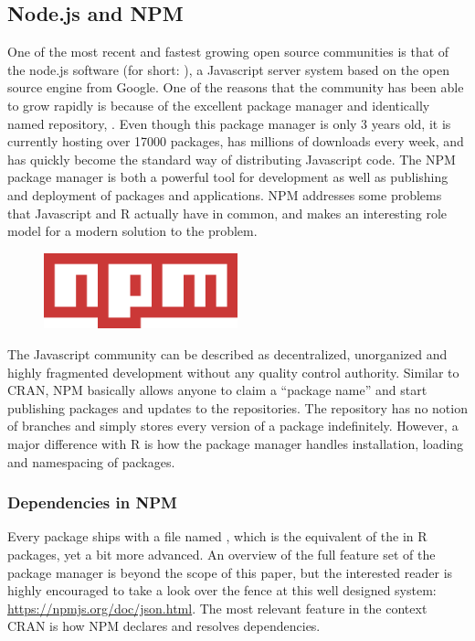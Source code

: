 \subsection{Node.js and NPM}

One of the most recent and fastest growing open source communities is that of
the node.js software (for short: ), a Javascript server
system based on the open source engine  from Google. One of the reasons
that the community has been able to grow rapidly is because of the excellent
package manager and identically named repository, . Even though this
package manager is only 3 years old, it is currently hosting over 17000
packages, has millions of downloads every week, and has quickly become the
standard way of distributing Javascript code. The NPM package manager is both a
powerful tool for development as well as publishing and deployment of packages
and applications. NPM addresses some problems that Javascript and R actually
have in common, and makes an interesting role model for a modern solution to the
problem.\\

\begin{figure}[placement specifier]
\centering
\includegraphics[width=0.5\textwidth]{npm}
\end{figure}

\noindent The Javascript community can be described as decentralized,
unorganized and highly fragmented development without any quality control authority. Similar to
CRAN, NPM basically allows anyone to claim a ``package name'' and start
publishing packages and updates to the repositories. The repository has no
notion of branches and simply stores every version of a package indefinitely.
However, a major difference with R is how the package manager handles
installation, loading and namespacing of packages.

\subsubsection{Dependencies in NPM}

Every  package ships with a file named , which is
the equivalent of the  in R packages, yet a bit more advanced.
An overview of the full feature set of the package manager is beyond the scope
of this paper, but the interested reader is highly encouraged to take a look
over the fence at this well designed system: \url{https://npmjs.org/doc/json.html}.
The most relevant feature in the context CRAN is how NPM declares and resolves
dependencies.

